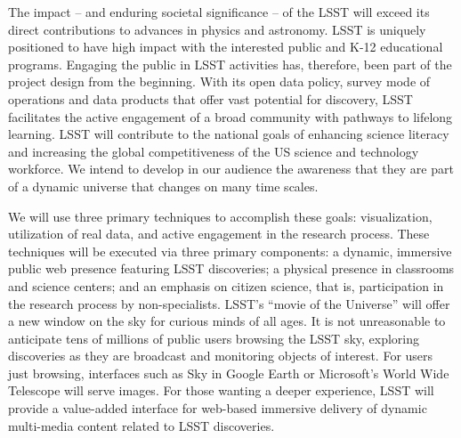 \documentclass{emulateapj}
\newcommand{\B}[1]{{#1}}
\begin{document}
\B{
The impact -- and enduring societal significance -- of the LSST will exceed its direct contributions 
to advances in physics and astronomy.  LSST is uniquely positioned to have high impact with the interested 
public and K-12 educational programs. Engaging the public in LSST activities has, therefore, been part of 
the project design from the beginning. 
With its open data policy, survey mode of operations and 
data products that offer vast potential for discovery, LSST facilitates the active engagement of a 
broad community with pathways to lifelong learning.  LSST will contribute to the national goals of 
enhancing science literacy and increasing the global competitiveness of the US science and technology 
workforce.  We intend to develop in our audience the awareness that they are part of a dynamic universe 
that changes on many time scales.  

We will use three primary techniques to accomplish these goals: visualization, utilization of real data, 
and active engagement in the research process. These techniques will be executed via three primary components: 
a dynamic, immersive public web presence featuring LSST discoveries; a physical presence in classrooms 
and science centers; and an emphasis on citizen science, that is, participation in the research process by 
non-specialists.  LSST's ``movie of the Universe'' will offer a new window on the sky for curious minds of 
all ages.  It is not unreasonable to anticipate tens of millions of public users browsing the LSST 
sky,
exploring discoveries as they are broadcast and monitoring objects 
of interest.  For users just browsing, interfaces such as Sky in Google Earth or Microsoft's World Wide Telescope 
will serve images.  For those wanting a deeper experience, LSST will provide a value-added interface for 
web-based immersive delivery of dynamic multi-media content related to LSST discoveries.

}
\end{document}
